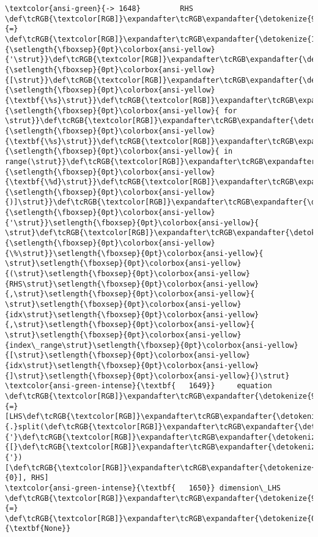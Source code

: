\documentclass[landscape,letterpaper,10pt,english]{article}
\begin{document}
\begin{Verbatim}[commandchars=\\\{\}, frame=single, framerule=2mm, rulecolor=\color{outerrorbackground}]
\textcolor{ansi-green}{-> 1648}         RHS \def\tcRGB{\textcolor[RGB]}\expandafter\tcRGB\expandafter{\detokenize{98,98,98}}{=} \def\tcRGB{\textcolor[RGB]}\expandafter\tcRGB\expandafter{\detokenize{175,0,0}}{\setlength{\fboxsep}{0pt}\colorbox{ansi-yellow}{'\strut}}\def\tcRGB{\textcolor[RGB]}\expandafter\tcRGB\expandafter{\detokenize{175,0,0}}{\setlength{\fboxsep}{0pt}\colorbox{ansi-yellow}{[\strut}}\def\tcRGB{\textcolor[RGB]}\expandafter\tcRGB\expandafter{\detokenize{175,95,135}}{\setlength{\fboxsep}{0pt}\colorbox{ansi-yellow}{\textbf{\%s}\strut}}\def\tcRGB{\textcolor[RGB]}\expandafter\tcRGB\expandafter{\detokenize{175,0,0}}{\setlength{\fboxsep}{0pt}\colorbox{ansi-yellow}{ for \strut}}\def\tcRGB{\textcolor[RGB]}\expandafter\tcRGB\expandafter{\detokenize{175,95,135}}{\setlength{\fboxsep}{0pt}\colorbox{ansi-yellow}{\textbf{\%s}\strut}}\def\tcRGB{\textcolor[RGB]}\expandafter\tcRGB\expandafter{\detokenize{175,0,0}}{\setlength{\fboxsep}{0pt}\colorbox{ansi-yellow}{ in range(\strut}}\def\tcRGB{\textcolor[RGB]}\expandafter\tcRGB\expandafter{\detokenize{175,95,135}}{\setlength{\fboxsep}{0pt}\colorbox{ansi-yellow}{\textbf{\%d}\strut}}\def\tcRGB{\textcolor[RGB]}\expandafter\tcRGB\expandafter{\detokenize{175,0,0}}{\setlength{\fboxsep}{0pt}\colorbox{ansi-yellow}{)]\strut}}\def\tcRGB{\textcolor[RGB]}\expandafter\tcRGB\expandafter{\detokenize{175,0,0}}{\setlength{\fboxsep}{0pt}\colorbox{ansi-yellow}{'\strut}}\setlength{\fboxsep}{0pt}\colorbox{ansi-yellow}{ \strut}\def\tcRGB{\textcolor[RGB]}\expandafter\tcRGB\expandafter{\detokenize{98,98,98}}{\setlength{\fboxsep}{0pt}\colorbox{ansi-yellow}{\%\strut}}\setlength{\fboxsep}{0pt}\colorbox{ansi-yellow}{ \strut}\setlength{\fboxsep}{0pt}\colorbox{ansi-yellow}{(\strut}\setlength{\fboxsep}{0pt}\colorbox{ansi-yellow}{RHS\strut}\setlength{\fboxsep}{0pt}\colorbox{ansi-yellow}{,\strut}\setlength{\fboxsep}{0pt}\colorbox{ansi-yellow}{ \strut}\setlength{\fboxsep}{0pt}\colorbox{ansi-yellow}{idx\strut}\setlength{\fboxsep}{0pt}\colorbox{ansi-yellow}{,\strut}\setlength{\fboxsep}{0pt}\colorbox{ansi-yellow}{ \strut}\setlength{\fboxsep}{0pt}\colorbox{ansi-yellow}{index\_range\strut}\setlength{\fboxsep}{0pt}\colorbox{ansi-yellow}{[\strut}\setlength{\fboxsep}{0pt}\colorbox{ansi-yellow}{idx\strut}\setlength{\fboxsep}{0pt}\colorbox{ansi-yellow}{]\strut}\setlength{\fboxsep}{0pt}\colorbox{ansi-yellow}{)\strut}
\textcolor{ansi-green-intense}{\textbf{   1649}}     equation \def\tcRGB{\textcolor[RGB]}\expandafter\tcRGB\expandafter{\detokenize{98,98,98}}{=} [LHS\def\tcRGB{\textcolor[RGB]}\expandafter\tcRGB\expandafter{\detokenize{98,98,98}}{.}split(\def\tcRGB{\textcolor[RGB]}\expandafter\tcRGB\expandafter{\detokenize{175,0,0}}{'}\def\tcRGB{\textcolor[RGB]}\expandafter\tcRGB\expandafter{\detokenize{175,0,0}}{[}\def\tcRGB{\textcolor[RGB]}\expandafter\tcRGB\expandafter{\detokenize{175,0,0}}{'})[\def\tcRGB{\textcolor[RGB]}\expandafter\tcRGB\expandafter{\detokenize{98,98,98}}{0}], RHS]
\textcolor{ansi-green-intense}{\textbf{   1650}} dimension\_LHS \def\tcRGB{\textcolor[RGB]}\expandafter\tcRGB\expandafter{\detokenize{98,98,98}}{=} \def\tcRGB{\textcolor[RGB]}\expandafter\tcRGB\expandafter{\detokenize{0,135,0}}{\textbf{None}}


\end{Verbatim}
\end{document}
